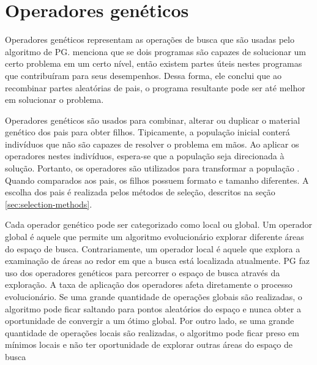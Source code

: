 
\section{Operadores genéticos} \label{sec:genetic-operators}
Operadores genéticos representam as operações de busca que são usadas pelo algoritmo de PG.  menciona que se dois programas são capazes de solucionar um certo problema em um certo nível, então existem partes úteis nestes programas que contribuíram para seus desempenhos. Dessa forma, ele conclui que ao recombinar partes aleatórias de pais, o programa resultante pode ser até melhor em solucionar o problema.

Operadores genéticos são usados para combinar, alterar ou duplicar o material genético dos pais para obter filhos. Tipicamente, a população inicial conterá indivíduos que não são capazes de resolver o problema em mãos. Ao aplicar os operadores nestes indivíduos, espera-se que a população seja direcionada à solução. Portanto, os operadores são utilizados para transformar a população \cite{banzhaf1998}. Quando comparados aos pais, os filhos possuem formato e tamanho diferentes. A escolha dos pais é realizada pelos métodos de seleção, descritos na seção \ref{sec:selection-methods}.

Cada operador genético pode ser categorizado como local ou global. Um operador global é aquele que permite um algoritmo evolucionário explorar diferente áreas do espaço de busca. Contrariamente, um operador local é aquele que explora a examinação de áreas ao redor em que a busca está localizada atualmente. PG faz uso dos operadores genéticos para percorrer o espaço de busca através da exploração. A taxa de aplicação dos operadores afeta diretamente o processo evolucionário. Se uma grande quantidade de operações globais são realizadas, o algoritmo pode ficar saltando para pontos aleatórios do espaço e nunca obter a oportunidade de convergir a um ótimo global. Por outro lado, se uma grande quantidade de operações locais são realizadas, o algoritmo pode ficar preso em mínimos locais e não ter oportunidade de explorar outras áreas do espaço de busca

